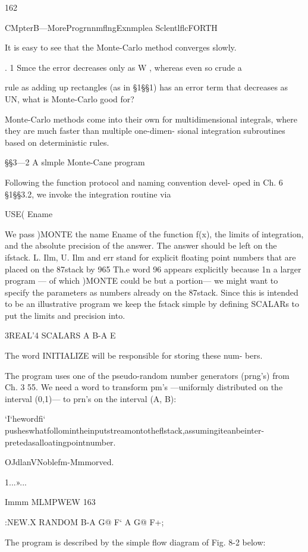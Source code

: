 162

CMpterB—MoreProgrnnmﬂngExnmplea SclentlﬂcFORTH

It is easy to see that the Monte-Carlo method converges slowly.

. 1
Smce the error decreases only as W , whereas even so crude a

rule as adding up rectangles (as in §1§§1) has an error term that
decreases as UN, what is Monte-Carlo good for?

Monte-Carlo methods come into their own for multidimensional
integrals, where they are much faster than multiple one-dimen-
sional integration subroutines based on deterministic rules.

§§3—2 A slmple Monte-Cane program

Following the function protocol and naming convention devel-
oped in Ch. 6 §1§§3.2, we invoke the integration routine via

USE( Ename %

We pass )MONTE the name Ename of the function f(x), the
limits of integration, and the absolute precision of the answer.
The answer should be left on the ifstack. L. Ilm, U. Ilm and err
stand for explicit ﬂoating point numbers that are placed on the
87stack by 965 Th.e word 96 appears explicitly because 1n a larger
program — of which )MONTE could be but a portion— we might
want to specify the parameters as numbers already on the 87stack.
Since this is intended to be an illustrative program we keep the
fstack simple by defining SCALARs to put the limits and
precision into.

3REAL'4 SCALARS A B-A E

The word INITIALIZE will be responsible for storing these num-
bers.

The program uses one of the pseudo-random number generators
(prng’s) from Ch. 3 55. We need a word to transform pm’s
—uniformly distributed on the interval (0,1)— to prn's on the
interval (A, B):

 

‘I‘hewordﬁ‘ pusheswhatfollomintheinputstreamontotheﬂstack,assumingiteanbeinter-
pretedasalloatingpointnumber.

OJdlanVNoblefm-Mmmorved.

1...»...

 

Immm MLMPWEW 163

:NEW.X RANDOM B-A G@ F‘ A G@ F+;

The program is described by the simple ﬂow diagram of Fig. 8-2
below:

